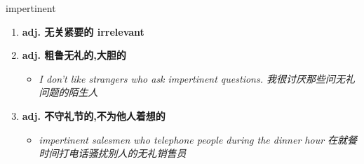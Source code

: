 
\begin{frame}
{\huge impertinent}
\begin{center}
\begin{enumerate}\Large
  \item \textbf{adj. 无关紧要的 irrelevant}
  \item \textbf{adj. 粗鲁无礼的,大胆的}
  \begin{itemize}
    \item \em{\Large{I don't like strangers who ask impertinent questions. 我很讨厌那些问无礼问题的陌生人}}
  \end{itemize}
  \item \textbf{adj. 不守礼节的,不为他人着想的}
  \begin{itemize}
    \item \em{\Large{impertinent salesmen who telephone people during the dinner hour 在就餐时间打电话骚扰别人的无礼销售员}}
  \end{itemize}
\end{enumerate}
\end{center}
\end{frame}
